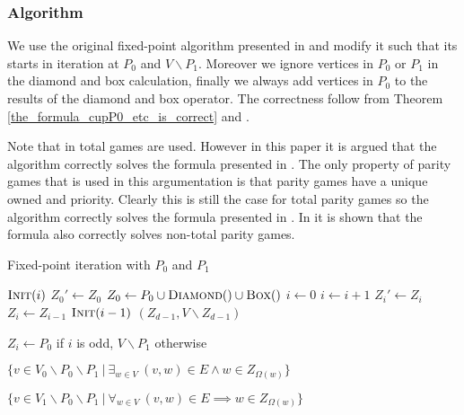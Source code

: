 \subsubsection{Algorithm}
We use the original fixed-point algorithm presented in \cite{FPITE} and modify it such that its starts in iteration at $P_0$ and $V\backslash P_1$. Moreover we ignore vertices in $P_0$ or $P_1$ in the diamond and box calculation, finally we always add vertices in $P_0$ to the results of the diamond and box operator. The correctness follow from Theorem \ref{the_formula_cupP0_etc_is_correct} and \cite{FPITE,WALUKIEWICZ2002311}.

Note that in \cite{FPITE} total games are used. However in this paper it is argued that the algorithm correctly solves the formula presented in \cite{WALUKIEWICZ2002311}. The only property of parity games that is used in this argumentation is that parity games have a unique owned and priority. Clearly this is still the case for total parity games so the algorithm correctly solves the formula presented in \cite{WALUKIEWICZ2002311}. In \cite{WALUKIEWICZ2002311} it is shown that the formula also correctly solves non-total parity games.

\begin{algorithm}
	\caption{Fixed-point iteration with $P_0$ and $P_1$}
	\label{alg_FPITE}
	\begin{multicols}{2}
		\begin{algorithmic}[1]
					\State $\textsc{Init}(i)$
				\EndFor
				\Repeat
					\State $Z_0'\gets Z_0$
					\State $Z_0 \gets P_0 \cup \textsc{Diamond}() \cup \textsc{Box}()$
					\State $i \gets 0$
						\State $i \gets i+1$
						\State $Z_i' \gets Z_i$
						\State $Z_i \gets Z_{i-1}$
						\State $\textsc{Init}(i-1)$
					\EndWhile
				\State \Return $(Z_{d-1},V\backslash Z_{d-1})$
			\EndFunction
		\end{algorithmic}\bigskip\bigskip
		\begin{algorithmic}[1]
			\Function{Init}{$i$}
				\State $Z_i \gets P_0$ if $i$ is odd, $V\backslash P_1$ otherwise
			\EndFunction
		\end{algorithmic}\bigskip
		\begin{algorithmic}[1]
			\Function{Diamond}{}
				\State \Return $\{ v \in V_0 \backslash P_0 \backslash P_1 \ |\ \exists_{w\in V}\ (v,w) \in E \wedge w \in Z_{\Omega(w)}\}$
			\EndFunction
		\end{algorithmic}\bigskip
		\begin{algorithmic}[1]
			\Function{Box}{}
			\State \Return $\{ v \in V_1\backslash P_0 \backslash P_1\ |\ \forall_{w\in V}\ (v,w) \in E \implies w \in Z_{\Omega(w)}\}$
			\EndFunction
		\end{algorithmic}
	\end{multicols}
\end{algorithm}

